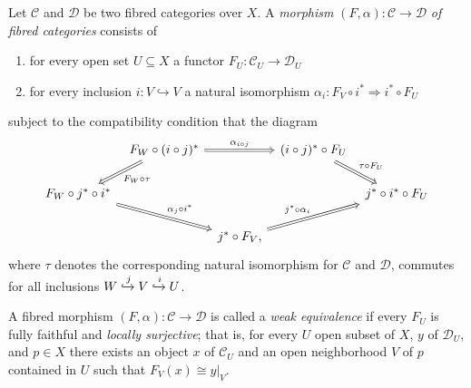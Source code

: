 \begin{definition}\label{def:morphisms-fibred-categories}
	Let $\mathcal{C}$ and $\mathcal{D}$ be two fibred categories over $X$. A \textit{morphism} $ (F, \alpha)\colon \mathcal{C} \to \mathcal{D}$ \textit{of fibred categories} consists of
	\begin{enumerate}[label = (\roman*)]
		\item for every open set $U \subseteq X$ a functor $ F_{U}\colon \mathcal{C}_{U} \to \mathcal{D}_{U}$ 
		\item for every inclusion $i\colon V \hookrightarrow V$ a natural isomorphism $\alpha_{i}\colon  F_{V} \circ i^{*} \Rightarrow i^{*} \circ  F_{U}$ 
	\end{enumerate}
	subject to the compatibility condition that the diagram
		\begin{equation}\label{eqn:morphisms-fibred-categories-compatibility}
		\begin{tikzcd}[column sep = tiny]
                                                        &  F_{W}\circ (i\circ j)^{*} \arrow[ld, Rightarrow, " F_{W}\circ \tau"] \arrow[rr, Rightarrow, "\alpha_{i\circ j}"] &                                            & (i \circ j)^{*} \circ  F_{U} \arrow[rd, Rightarrow, "\tau \circ  F_U"] &                                 \\
 F_{W}\circ j^{*} \circ i^{*} \arrow[rrd, Rightarrow, "\alpha_{j}\circ i^{*}"] &                                                                            &                                            &                                                       & j^{*}\circ i^{*} \circ  F_{U} \\
                                                        &                                                                            & j^{*}\circ F_{V}, \arrow[rru, Rightarrow, "j^{*}\circ \alpha_{i}"] &                                                       &                                
		\end{tikzcd}
		\end{equation}
		where $\tau$ denotes the corresponding natural isomorphism for $\mathcal{C}$ and $\mathcal{D}$, commutes for all inclusions $W \xhookrightarrow{j} V \xhookrightarrow{i} U$. 	
\end{definition}
\begin{definition}\label{def:weak-equivalence}
	A fibred morphism $(F, \alpha)\colon \mathcal{C} \to \mathcal{D}$ is called a \textit{weak equivalence} if every $F_{U}$ is fully faithful and \emph{locally surjective}; that is, for every $U$ open subset of $X$, $y$ of $\mathcal{D}_{U}$, and $p \in X$ there exists an object $x$ of $\mathcal{C}_{U}$ and an open neighborhood $V$ of $p$ contained in $U$ such that $F_{V}(x) \cong y\lvert_{V}$.
\end{definition}
